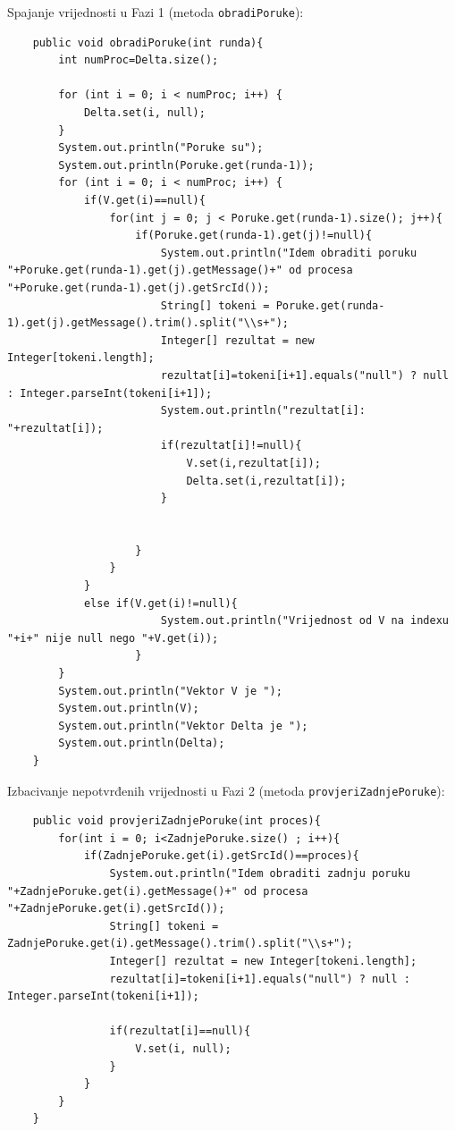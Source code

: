 \documentclass[11pt,a4paper]{article}
\begin{document}
Spajanje vrijednosti u Fazi 1 (metoda \texttt{obradiPoruke}):

\begin{lstlisting}
    public void obradiPoruke(int runda){
        int numProc=Delta.size();

        for (int i = 0; i < numProc; i++) {
            Delta.set(i, null);
        }
        System.out.println("Poruke su");
        System.out.println(Poruke.get(runda-1));
        for (int i = 0; i < numProc; i++) {
            if(V.get(i)==null){
                for(int j = 0; j < Poruke.get(runda-1).size(); j++){
                    if(Poruke.get(runda-1).get(j)!=null){
                        System.out.println("Idem obraditi poruku "+Poruke.get(runda-1).get(j).getMessage()+" od procesa "+Poruke.get(runda-1).get(j).getSrcId());
                        String[] tokeni = Poruke.get(runda-1).get(j).getMessage().trim().split("\\s+");
                        Integer[] rezultat = new Integer[tokeni.length];
                        rezultat[i]=tokeni[i+1].equals("null") ? null : Integer.parseInt(tokeni[i+1]);
                        System.out.println("rezultat[i]: "+rezultat[i]);
                        if(rezultat[i]!=null){
                            V.set(i,rezultat[i]);
                            Delta.set(i,rezultat[i]);
                        }


                    }
                }
            }
            else if(V.get(i)!=null){
                        System.out.println("Vrijednost od V na indexu "+i+" nije null nego "+V.get(i));
                    }
        }
        System.out.println("Vektor V je ");
        System.out.println(V);
        System.out.println("Vektor Delta je ");
        System.out.println(Delta);
    }
\end{lstlisting}

Izbacivanje nepotvrđenih vrijednosti u Fazi 2 (metoda
\texttt{provjeriZadnjePoruke}):

\begin{lstlisting}
    public void provjeriZadnjePoruke(int proces){
        for(int i = 0; i<ZadnjePoruke.size() ; i++){
            if(ZadnjePoruke.get(i).getSrcId()==proces){
                System.out.println("Idem obraditi zadnju poruku "+ZadnjePoruke.get(i).getMessage()+" od procesa "+ZadnjePoruke.get(i).getSrcId());
                String[] tokeni = ZadnjePoruke.get(i).getMessage().trim().split("\\s+");
                Integer[] rezultat = new Integer[tokeni.length];
                rezultat[i]=tokeni[i+1].equals("null") ? null : Integer.parseInt(tokeni[i+1]);

                if(rezultat[i]==null){
                    V.set(i, null);
                }
            }
        }
    }
\end{lstlisting}
\end{document}
